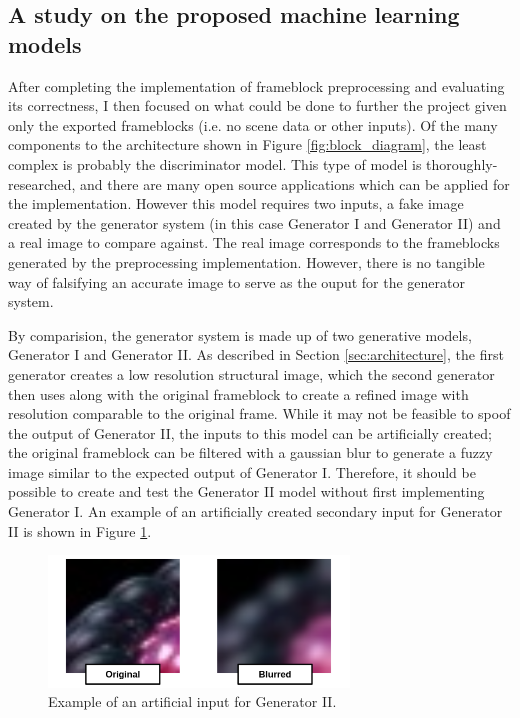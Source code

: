 \documentclass[conference]{IEEEtran}
\begin{document}
\subsection{A study on the proposed machine learning models}
\label{subsec:machine_learning}
After completing the implementation of frameblock preprocessing and evaluating
its correctness, I then focused on what could be done to further the project
given only the exported frameblocks (i.e. no scene data or other inputs). Of the
many components to the architecture shown in Figure \ref{fig:block_diagram}, the
least complex is probably the discriminator model.
This type of model is
thoroughly-researched, and there are many open source applications which can be
applied for the implementation. However this model requires two inputs, a fake
image created by the generator system (in this case Generator I and Generator
II) and a real image to compare against. The real image corresponds to the
frameblocks generated by the preprocessing implementation. However, there is no
tangible way of falsifying an accurate image to serve as the ouput for the
generator system.

By comparision, the generator system is made up of two generative models, Generator I and
Generator II. As described in Section \ref{sec:architecture}, the first
generator creates a low resolution structural image, which the second generator
then uses along with the original frameblock to create a refined image with
resolution comparable to the original frame. While it may not be
feasible to spoof the output of Generator II, the inputs to this model can be
artificially created; the original frameblock can be filtered with a gaussian
blur to generate a fuzzy image similar to the expected output of Generator I.
Therefore, it should be possible to
create and test the Generator II model without first implementing Generator I. An
example of an artificially created secondary input for Generator II is shown in
Figure \ref{fig:generator_II}.

\begin{figure}[htbp]
\centerline{\includegraphics[width=8cm]{generator_II.png}}
\caption{Example of an artificial input for Generator II.}
\label{fig:generator_II}
\end{figure}
\end{document}
